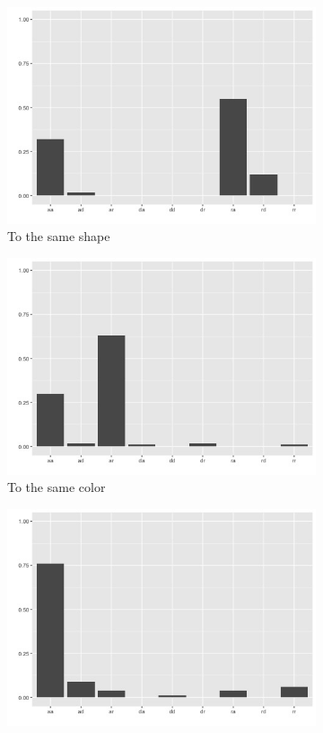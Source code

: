 \documentclass{article}
\begin{document}
\begin{figure}[h!]
  \centering
  \begin{subfigure}[t]{0.25\textwidth}
    \centering
    \includegraphics[width=\linewidth]{agg_g1} 
    \caption{To the same shape} \label{fig:agg_g1}
  \end{subfigure}
  \begin{subfigure}[t]{0.25\textwidth}
    \centering
    \includegraphics[width=\linewidth]{agg_g3} 
    \caption{To the same color} \label{fig:agg_g3}
  \end{subfigure}
  \begin{subfigure}[t]{0.25\textwidth}
    \centering
    \includegraphics[width=\linewidth]{agg_g6} 

\end{subfigure}
\end{figure}
\end{document}
